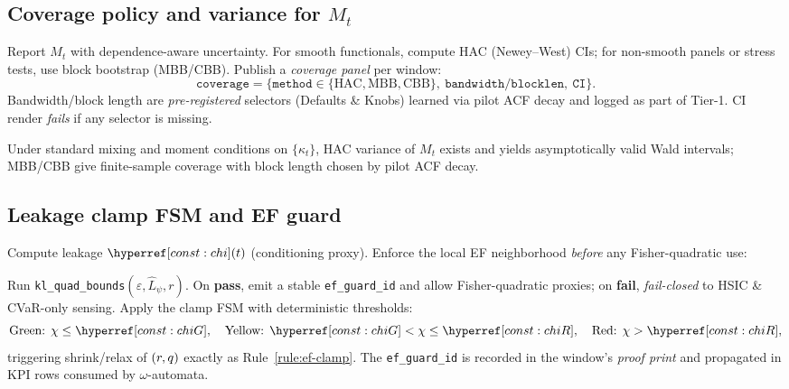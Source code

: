 \subsection{Coverage policy and variance for $M_t$}\label{subsec:coverage}
\emph{}

Report $M_t$ with dependence-aware uncertainty. For smooth functionals, compute HAC (Newey–West) CIs; for non-smooth panels or stress tests, use block bootstrap (MBB/CBB). Publish a \emph{coverage panel} per window:
\[
\texttt{coverage}=\{\texttt{method}\in\{\text{HAC},\text{MBB},\text{CBB}\},\ \texttt{bandwidth/blocklen},\ \texttt{CI}\}.
\]
Bandwidth/block length are \emph{pre-registered} selectors (Defaults \& Knobs) learned via pilot ACF decay and logged as part of Tier-1. CI render \emph{fails} if any selector is missing.


\begin{lemma}\label{lem:Mt-ci}
Under standard mixing and moment conditions on $\{\kappa_t\}$, HAC variance of $M_t$ exists and yields asymptotically valid Wald intervals; MBB/CBB give finite-sample coverage with block length chosen by pilot ACF decay.
\end{lemma}

\subsection{Leakage clamp FSM and EF guard}\label{subsec:clamp}
\emph{}

Compute leakage $\constref{chi}(t)$ (conditioning proxy). Enforce the local EF neighborhood \emph{before} any Fisher-quadratic use:

\begin{definition}\label{def:ef-guard-op}
Run \texttt{kl\_quad\_bounds$(\varepsilon,\hat L_\psi,r)$}. On \textbf{pass}, emit a stable \texttt{ef\_guard\_id} and allow Fisher-quadratic proxies; on \textbf{fail}, \emph{fail-closed} to HSIC \& CVaR-only sensing. Apply the clamp FSM with deterministic thresholds:
\[
\text{Green: }\chi\le\constref{chiG},\quad
\text{Yellow: }\constref{chiG}<\chi\le\constref{chiR},\quad
\text{Red: }\chi>\constref{chiR},
\]
triggering shrink/relax of $(r,q)$ exactly as Rule~\ref{rule:ef-clamp}. The \texttt{ef\_guard\_id} is recorded in the window’s \emph{proof print} and propagated in KPI rows consumed by $\omega$-automata.
\end{definition}

